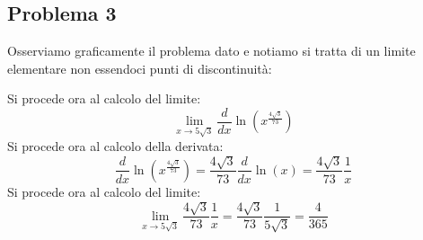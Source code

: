 
\subsection{Problema 3}
Osserviamo graficamente il problema dato e notiamo si tratta di un limite elementare non essendoci punti di discontinuità:
\begin{center}
\end{center}

\noindent Si procede ora al calcolo del limite:
\begin{equation}
    \lim_{x \rightarrow 5\sqrt{3}} \frac{d}{dx} \ln(x^{\frac{4\sqrt{3}}{73}})
\end{equation}
Si procede ora al calcolo della derivata:
\begin{equation}
    \frac{d}{dx} \ln(x^{\frac{4\sqrt{3}}{73}}) = \frac{4\sqrt{3}}{73} \frac{d}{dx} \ln(x) = \frac{4\sqrt{3}}{73} \frac{1}{x}
\end{equation}
Si procede ora al calcolo del limite:
\begin{equation}
    \lim_{x \rightarrow 5\sqrt{3}} \frac{4\sqrt{3}}{73} \frac{1}{x} = \frac{4\sqrt{3}}{73} \frac{1}{5\sqrt{3}} = \frac{4}{365}
\end{equation}